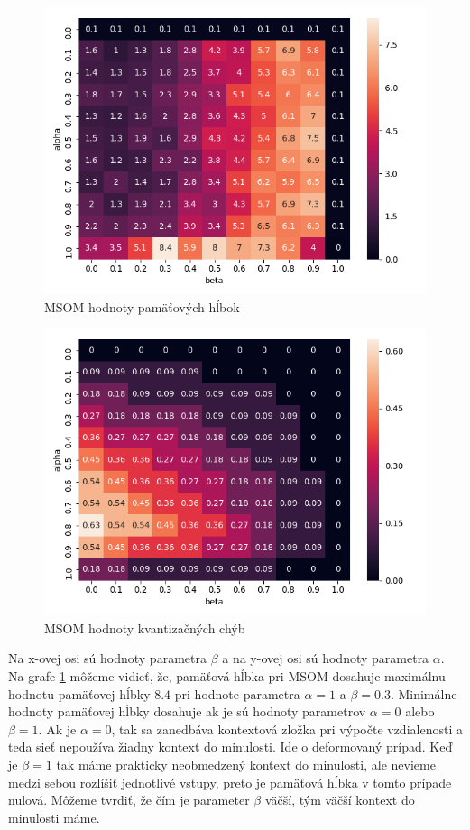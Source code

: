     \begin{figure}[H]
        \centering
        \includegraphics[width=\textwidth]{assets/m_memory_span}
        \caption{MSOM hodnoty pamäťových hĺbok}
        \label{msom_memory_span}
    \end{figure}
    
    \begin{figure}[H]
        \centering
        \includegraphics[width=\textwidth]{assets/m_errors}
        \caption{MSOM hodnoty kvantizačných chýb}
        \label{msom_errors}
    \end{figure}

 Na x-ovej osi sú hodnoty parametra $\beta$ a na y-ovej osi sú hodnoty parametra $\alpha$. 
 Na grafe \ref{msom_memory_span} môžeme vidieť, že, pamäťová hĺbka pri MSOM dosahuje maximálnu 
 hodnotu pamäťovej hĺbky $8.4$ pri hodnote parametra $\alpha = 1$ a $\beta = 0.3$.  
 Minimálne hodnoty pamäťovej hĺbky dosahuje ak je sú hodnoty parametrov $\alpha = 0$ alebo $\beta = 1$.
 Ak je $\alpha = 0$, tak sa zanedbáva kontextová zložka pri výpočte vzdialenosti a teda sieť nepoužíva žiadny kontext do minulosti. Ide o deformovaný prípad.
 Keď je $\beta = 1$ tak máme prakticky neobmedzený kontext do minulosti, ale nevieme medzi sebou rozlíšiť jednotlivé vstupy, preto je 
 pamäťová hĺbka v tomto prípade nulová. Môžeme tvrdiť, že čím je parameter $\beta$ väčší, tým väčší kontext do minulosti máme.
 
